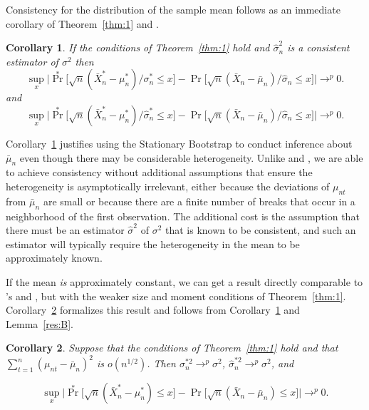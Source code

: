 \documentclass[11pt]{article}
\newcommand\citepos[2][]{\citeauthor{#2}'s \citeyearpar[#1]{#2}}
\newtheorem{cor}{Corollary}
\theoremstyle{definition}
\DeclareMathOperator{\pr}{Pr}
\begin{document}
Consistency for the distribution of the sample mean follows as an
immediate corollary of Theorem~\ref{thm:1} and \citet[Theorem~2]{Jon:97}.

\begin{cor}\label{cor:1} 
  If the conditions of Theorem~\ref{thm:1} hold and $\hat{\sigma}^2_n$
  is a consistent estimator of $\sigma^2$ then
  \begin{equation}
    \label{eq:31}
    \sup_{x} \big\lvert \pr^{*}\big[
    \sqrt{n}(\bar X_{n}^{*} - \mu_{n}^{*}) / \sigma_{n}^{*}
    \leq x \big]
    - \pr\big[\sqrt{n}(\bar X_n - \bar{\mu}_n)/\hat{\sigma}_n \leq x \big] \big\rvert \to^p 0.
  \end{equation}
  and
  \begin{equation}
    \label{eq:11}
    \sup_{x} \big\lvert \pr^{*}\big[
    \sqrt{n} (\bar X_{n}^{*} - \mu_{n}^{*}) \big/ \hat\sigma^{*}_{n}
    \leq x \big]
    - \pr\big[\sqrt{n}(\bar X_n - \bar{\mu}_n)/\hat{\sigma}_n \leq x \big] \big\rvert \to^p 0.
  \end{equation}
\end{cor}

Corollary~\ref{cor:1} justifies using the Stationary Bootstrap to
conduct inference about $\bar \mu_n$ even though there may be
considerable heterogeneity.  Unlike \citet{GoW:02} and \citet{GoJ:03},
we are able to achieve consistency without
additional assumptions that ensure the heterogeneity is asymptotically
irrelevant, either because the deviations of $\mu_{nt}$ from $\bar
\mu_n$ are small or because there are a finite number of breaks that
occur in a neighborhood of the first observation.
The additional cost is the assumption that there must be an estimator
$\hat\sigma^2$ of $\sigma^2$ that is known to be consistent, and such an
estimator will typically require the heterogeneity in the mean to be
approximately known.

If the mean \textit{is} approximately constant, we can get a result
directly comparable to \citepos{GoW:02} and \citet{GoJ:03}, but with
the weaker size and moment conditions of Theorem~\ref{thm:1}.
Corollary~\ref{cor:2} formalizes this result and follows from
Corollary~\ref{cor:1} and Lemma~\ref{res:B}.
\begin{cor}\label{cor:2}
  Suppose that the conditions of Theorem~\ref{thm:1} hold and that
  $\sum_{t=1}^n (\mu_{nt} - \bar{\mu}_n)^2$ is $o(n^{1/2})$.  
  Then $\sigma_n^{*2} \to^p
  \sigma^2$, $\hat{\sigma}_n^{*2} \to^p \sigma^2$, and
\end{cor}
  \begin{equation}
    \sup_{x} \big\lvert \pr^{*}\big[
    \sqrt{n}(\bar X_{n}^{*} - \mu_{n}^{*})
    \leq x \big]
    - \pr\big[\sqrt{n}(\bar X_n - \bar{\mu}_n) \leq x \big] \big\rvert \to^p 0.
  \end{equation}
\end{document}
